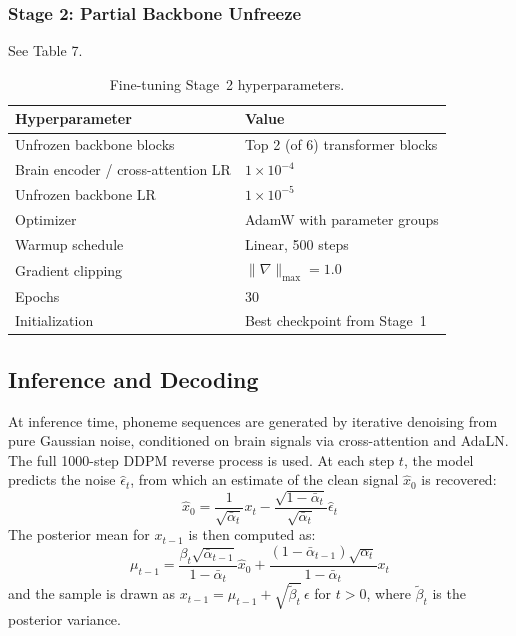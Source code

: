 \documentclass{article}
\begin{document}
\subsubsection{Stage 2: Partial Backbone Unfreeze}
See Table 7.
 
\begin{table}[h]
\centering
\caption{Fine-tuning Stage~2 hyperparameters.}
\label{tab:finetune_s2}
\begin{tabular}{ll}
\toprule
\textbf{Hyperparameter} & \textbf{Value} \\
\midrule
Unfrozen backbone blocks & Top 2 (of 6) transformer blocks \\
Brain encoder / cross-attention LR & $1 \times 10^{-4}$ \\
Unfrozen backbone LR & $1 \times 10^{-5}$ \\
Optimizer & AdamW with parameter groups \\
Warmup schedule & Linear, 500 steps \\
Gradient clipping & $\|\nabla\|_{\max} = 1.0$ \\
Epochs & 30 \\
Initialization & Best checkpoint from Stage~1 \\
\bottomrule
\end{tabular}
\end{table}
 
\subsection{Inference and Decoding}
 
At inference time, phoneme sequences are generated by iterative denoising from pure Gaussian noise, conditioned on brain signals via cross-attention and AdaLN. The full 1000-step DDPM reverse process is used. At each step $t$, the model predicts the noise $\hat{\epsilon}_t$, from which an estimate of the clean signal $\hat{x}_0$ is recovered:
\begin{equation}
    \hat{x}_0 = \frac{1}{\sqrt{\bar{\alpha}_t}} x_t - \frac{\sqrt{1 - \bar{\alpha}_t}}{\sqrt{\bar{\alpha}_t}} \hat{\epsilon}_t
\end{equation}
The posterior mean for $x_{t-1}$ is then computed as:
\begin{equation}
    \mu_{t-1} = \frac{\beta_t \sqrt{\bar{\alpha}_{t-1}}}{1 - \bar{\alpha}_t} \hat{x}_0 + \frac{(1 - \bar{\alpha}_{t-1})\sqrt{\alpha_t}}{1 - \bar{\alpha}_t} x_t
\end{equation}
and the sample is drawn as $x_{t-1} = \mu_{t-1} + \sqrt{\tilde{\beta}_t}\, \epsilon$ for $t > 0$, where $\tilde{\beta}_t$ is the posterior variance.
 
\end{document}
